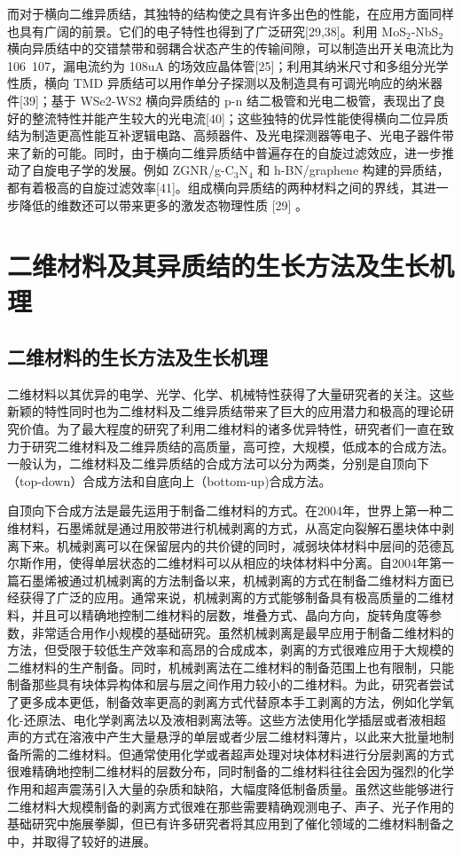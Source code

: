 而对于横向二维异质结，其独特的结构使之具有许多出色的性能，在应用方面同样也具有广阔的前景。它们的电子特性也得到了广泛研究[29,38]。利用 MoS$_2$-NbS$_2$ 横向异质结中的交错禁带和弱耦合状态产生的传输间隙，可以制造出开关电流比为 106~107，漏电流约为 108uA 的场效应晶体管[25]；利用其纳米尺寸和多组分光学性质，横向 TMD 异质结可以用作单分子探测以及制造具有可调光响应的纳米器件[39]；基于 WSe2-WS2 横向异质结的 p-n 结二极管和光电二极管，表现出了良好的整流特性并能产生较大的光电流[40]；这些独特的优异性能使得横向二位异质结为制造更高性能互补逻辑电路、高频器件、及光电探测器等电子、光电子器件带来了新的可能。同时，由于横向二维异质结中普遍存在的自旋过滤效应，进一步推动了自旋电子学的发展。例如 ZGNR/g-C$_3$N$_4$ 和 h-BN/graphene 构建的异质结，都有着极高的自旋过滤效率[41]。组成横向异质结的两种材料之间的界线，其进一步降低的维数还可以带来更多的激发态物理性质 [29] 。

\section{二维材料及其异质结的生长方法及生长机理}
\subsection{二维材料的生长方法及生长机理}
二维材料以其优异的电学、光学、化学、机械特性获得了大量研究者的关注。这些新颖的特性同时也为二维材料及二维异质结带来了巨大的应用潜力和极高的理论研究价值。为了最大程度的研究了利用二维材料的诸多优异特性，研究者们一直在致力于研究二维材料及二维异质结的高质量，高可控，大规模，低成本的合成方法。一般认为，二维材料及二维异质结的合成方法可以分为两类，分别是自顶向下（top-down）合成方法和自底向上（bottom-up)合成方法。%

自顶向下合成方法是最先运用于制备二维材料的方式。在2004年，世界上第一种二维材料，石墨烯就是通过用胶带进行机械剥离的方式，从高定向裂解石墨块体中剥离下来。机械剥离可以在保留层内的共价键的同时，减弱块体材料中层间的范德瓦尔斯作用，使得单层状态的二维材料可以从相应的块体材料中分离。自2004年第一篇石墨烯被通过机械剥离的方法制备以来，机械剥离的方式在制备二维材料方面已经获得了广泛的应用。通常来说，机械剥离的方式能够制备具有极高质量的二维材料，并且可以精确地控制二维材料的层数，堆叠方式、晶向方向，旋转角度等参数，非常适合用作小规模的基础研究。虽然机械剥离是最早应用于制备二维材料的方法，但受限于较低生产效率和高昂的合成成本，剥离的方式很难应用于大规模的二维材料的生产制备。同时，机械剥离法在二维材料的制备范围上也有限制，只能制备那些具有块体异构体和层与层之间作用力较小的二维材料。为此，研究者尝试了更多成本更低，制备效率更高的剥离方式代替原本手工剥离的方法，例如化学氧化-还原法、电化学剥离法以及液相剥离法等。这些方法使用化学插层或者液相超声的方式在溶液中产生大量悬浮的单层或者少层二维材料薄片，以此来大批量地制备所需的二维材料。但通常使用化学或者超声处理对块体材料进行分层剥离的方式很难精确地控制二维材料的层数分布，同时制备的二维材料往往会因为强烈的化学作用和超声震荡引入大量的杂质和缺陷，大幅度降低制备质量。虽然这些能够进行二维材料大规模制备的剥离方式很难在那些需要精确观测电子、声子、光子作用的基础研究中施展拳脚，但已有许多研究者将其应用到了催化领域的二维材料制备之中，并取得了较好的进展。

